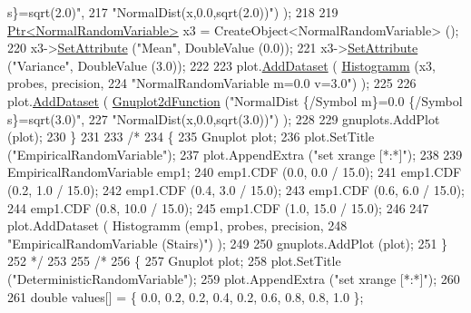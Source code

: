 \begin{DoxyCode}
{       s\}=sqrt(2.0)"},
217                                          \textcolor{stringliteral}{"NormalDist(x,0.0,sqrt(2.0))"}) );
218 
219     \hyperlink{classns3_1_1Ptr}{Ptr<NormalRandomVariable>} x3 = CreateObject<NormalRandomVariable> ();
220     x3->\hyperlink{classns3_1_1ObjectBase_ac60245d3ea4123bbc9b1d391f1f6592f}{SetAttribute} (\textcolor{stringliteral}{"Mean"}, DoubleValue (0.0));
221     x3->\hyperlink{classns3_1_1ObjectBase_ac60245d3ea4123bbc9b1d391f1f6592f}{SetAttribute} (\textcolor{stringliteral}{"Variance"}, DoubleValue (3.0));
222 
223     plot.\hyperlink{classns3_1_1Gnuplot_a306ec724a327cf9ab699700f31fca0a1}{AddDataset} ( \hyperlink{main-random-variable-stream_8cc_a2cfd3837ab3f2e816cf53486d7a186b5}{Histogramm} (x3, probes, precision,
224                                   \textcolor{stringliteral}{"NormalRandomVariable m=0.0 v=3.0"}) );
225 
226     plot.\hyperlink{classns3_1_1Gnuplot_a306ec724a327cf9ab699700f31fca0a1}{AddDataset} ( \hyperlink{classns3_1_1Gnuplot2dFunction}{Gnuplot2dFunction} (\textcolor{stringliteral}{"NormalDist \{/Symbol m\}=0.0 \{/Symbol
       s\}=sqrt(3.0)"},
227                                          \textcolor{stringliteral}{"NormalDist(x,0.0,sqrt(3.0))"}) );
228 
229     gnuplots.AddPlot (plot);
230   \}
231 
233   \textcolor{comment}{/*}
234 \textcolor{comment}{  \{}
235 \textcolor{comment}{    Gnuplot plot;}
236 \textcolor{comment}{    plot.SetTitle ("EmpiricalRandomVariable");}
237 \textcolor{comment}{    plot.AppendExtra ("set xrange [*:*]");}
238 \textcolor{comment}{}
239 \textcolor{comment}{    EmpiricalRandomVariable emp1;}
240 \textcolor{comment}{    emp1.CDF (0.0,  0.0 / 15.0);}
241 \textcolor{comment}{    emp1.CDF (0.2,  1.0 / 15.0);}
242 \textcolor{comment}{    emp1.CDF (0.4,  3.0 / 15.0);}
243 \textcolor{comment}{    emp1.CDF (0.6,  6.0 / 15.0);}
244 \textcolor{comment}{    emp1.CDF (0.8, 10.0 / 15.0);}
245 \textcolor{comment}{    emp1.CDF (1.0, 15.0 / 15.0);}
246 \textcolor{comment}{}
247 \textcolor{comment}{    plot.AddDataset ( Histogramm (emp1, probes, precision,}
248 \textcolor{comment}{                                  "EmpiricalRandomVariable (Stairs)") );}
249 \textcolor{comment}{}
250 \textcolor{comment}{    gnuplots.AddPlot (plot);}
251 \textcolor{comment}{  \}}
252 \textcolor{comment}{  */}
253 
255   \textcolor{comment}{/*}
256 \textcolor{comment}{  \{}
257 \textcolor{comment}{    Gnuplot plot;}
258 \textcolor{comment}{    plot.SetTitle ("DeterministicRandomVariable");}
259 \textcolor{comment}{    plot.AppendExtra ("set xrange [*:*]");}
260 \textcolor{comment}{}
261 \textcolor{comment}{    double values[] = \{ 0.0, 0.2, 0.2, 0.4, 0.2, 0.6, 0.8, 0.8, 1.0 \};}

\end{DoxyCode}
